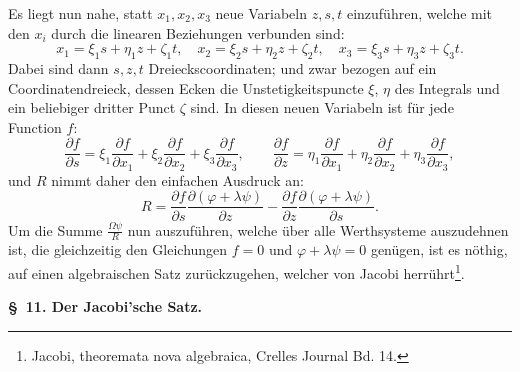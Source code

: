 \documentclass[10pt]{article}
\begin{document}
Es liegt nun nahe, statt $x_1,x_2,x_3$ neue Variabeln $z,s,t$ einzuführen, welche mit den $x_i$ durch die linearen Beziehungen verbunden sind:
\[
x_1=\xi_1s+\eta_1z+\zeta_1t,\quad
x_2=\xi_2s+\eta_2z+\zeta_2t,\quad
x_3=\xi_3s+\eta_3z+\zeta_3t.
\]
Dabei sind dann $s,z,t$ Dreieckscoordinaten; und zwar bezogen auf ein Coordinatendreieck, dessen Ecken die Unstetigkeitspuncte $\xi$, $\eta$ des Integrals und ein beliebiger dritter Punct $\zeta$ sind. In diesen neuen Variabeln ist für jede Function $f$:
\[
\frac{\partial f}{\partial s}=\xi_1\frac{\partial f}{\partial x_1}+\xi_2\frac{\partial f}{\partial x_2}+\xi_3\frac{\partial f}{\partial x_3},\qquad
\frac{\partial f}{\partial z}=\eta_1\frac{\partial f}{\partial x_1}+\eta_2\frac{\partial f}{\partial x_2}+\eta_3\frac{\partial f}{\partial x_3},
\]
und $R$ nimmt daher den einfachen Ausdruck an:
\[
R=\frac{\partial f}{\partial s}\frac{\partial(\varphi+\lambda\psi)}{\partial z}
-\frac{\partial f}{\partial z}\frac{\partial(\varphi+\lambda\psi)}{\partial s}.
\]
Um die Summe $\frac{\Omega\psi}{R}$ nun auszuführen, welche über alle Werthsysteme auszudehnen ist, die gleichzeitig den Gleichungen $f=0$ und $\varphi+\lambda\psi=0$ genügen, ist es nöthig, auf einen algebraischen Satz zurückzugehen, welcher von Jacobi herrührt\footnote{Jacobi, theoremata nova algebraica, Crelles Journal Bd. 14.}.

\begin{center}
{\bfseries \S\ 11. Der Jacobi'sche Satz.}
\end{center}
\end{document}
